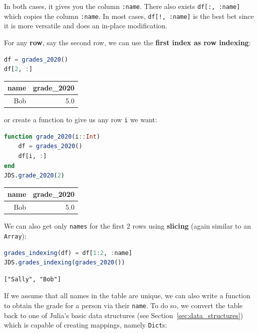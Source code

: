 \documentclass[
  notoc %
]{tufte-book}
\newcommand{\passthrough}[1]{#1}
\begin{document}
In both cases, it gives you the column \passthrough{\lstinline!:name!}.
There also exists \passthrough{\lstinline!df[:, :name]!} which copies
the column \passthrough{\lstinline!:name!}. In most cases,
\passthrough{\lstinline"df[!, :name]"} is the best bet since it is more
versatile and does an in-place modification.

For any \textbf{row}, say the second row, we can use the \textbf{first
index as row indexing}:

\begin{lstlisting}[language=Julia]
df = grades_2020()
df[2, :]
\end{lstlisting}

\begin{longtable}[]{@{}rr@{}}
\toprule()
name & grade\_2020 \\
\midrule()
\endhead
Bob & 5.0 \\
\bottomrule()
\end{longtable}

or create a function to give us any row \passthrough{\lstinline!i!} we
want:

\begin{lstlisting}[language=Julia]
function grade_2020(i::Int)
    df = grades_2020()
    df[i, :]
end
JDS.grade_2020(2)
\end{lstlisting}

\begin{longtable}[]{@{}rr@{}}
\toprule()
name & grade\_2020 \\
\midrule()
\endhead
Bob & 5.0 \\
\bottomrule()
\end{longtable}

We can also get only \passthrough{\lstinline!names!} for the first 2
rows using \textbf{slicing} (again similar to an
\passthrough{\lstinline!Array!}):

\begin{lstlisting}[language=Julia]
grades_indexing(df) = df[1:2, :name]
JDS.grades_indexing(grades_2020())
\end{lstlisting}

\begin{lstlisting}[language=Output]
["Sally", "Bob"]
\end{lstlisting}

If we assume that all names in the table are unique, we can also write a
function to obtain the grade for a person via their
\passthrough{\lstinline!name!}. To do so, we convert the table back to
one of Julia's basic data structures (see
Section~\ref{sec:data_structures}) which is capable of creating
mappings, namely \passthrough{\lstinline!Dict!}s:
\end{document}
